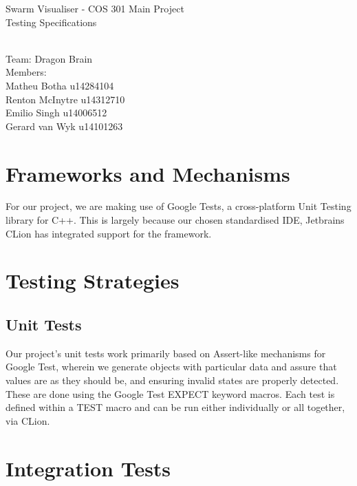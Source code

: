 \documentclass[11pt]{article}
\begin{document}
\begin{titlepage}

\begin{center}
\begin{huge}
Swarm Visualiser - COS 301 Main Project
\\
Testing Specifications
\begin{small}
\\
Team: Dragon Brain
\\
Members:
\\
Matheu Botha u14284104
\\
Renton McInytre u14312710
\\
Emilio Singh u14006512
\\
Gerard van Wyk u14101263

\end{small}

\end{huge}
\end{center}
\end{titlepage}

\pagebreak

\tableofcontents

\section{Frameworks and Mechanisms}
For our project, we are making use of Google Tests, a cross-platform Unit Testing library for C++. This is largely because our chosen standardised IDE, Jetbrains CLion has integrated support for the framework.

\section{Testing Strategies}

\subsection{Unit Tests}
Our project's unit tests work primarily based on Assert-like mechanisms for Google Test, wherein we generate objects with particular data and assure that values are as they should be, and ensuring invalid states are properly detected. These are done using the Google Test EXPECT keyword macros.
\newline Each test is defined within a TEST macro and can be run either individually or all together, via CLion. 


\section{Integration Tests}
\end{document}
